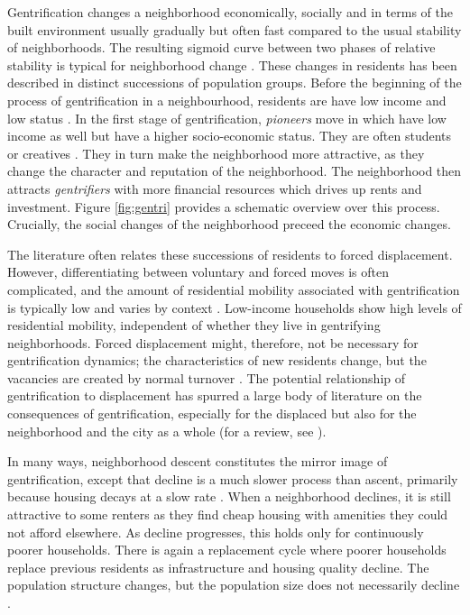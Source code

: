 \documentclass[a4paper,12pt]{article}
\begin{document}
Gentrification changes a neighborhood economically, socially and in terms of the built environment usually gradually but often fast compared to the usual stability of neighborhoods. The resulting sigmoid curve between two phases of relative stability is typical for neighborhood change \citep[927f]{meenSocialBehaviourBasis2003}. These changes in residents has been described in distinct successions of population groups. Before the beginning of the process of gentrification in a neighbourhood, residents are have low income and low status \citep{zukinGentrificationCultureCapital1987, dangschatGentrificationHamburg1991, blasiusPioneersGentrifiersProcess2016}. In the first stage of gentrification, \textit{pioneers} move in which have low income as well but have a higher socio-economic status. They are often students or creatives \citep{zukinGentrificationCultureCapital1987, blasiusPioneersGentrifiersProcess2016}. They in turn make the neighborhood more attractive, as they change the character and reputation of the neighborhood. The neighborhood then attracts \textit{gentrifiers} with more financial resources which drives up rents and investment. Figure \ref{fig:gentri} provides a schematic overview over this process. Crucially, the social changes of the neighborhood preceed the economic changes.

The literature often relates these successions of residents to forced displacement. However, differentiating between voluntary and forced moves is often complicated, and the amount of residential mobility associated with gentrification is typically low and varies by context \citep{freemanDisplacementSuccessionResidential2005, dingGentrificationResidentialMobility2016, leeGeographyGentrificationResidential2023}. Low-income households show high levels of residential mobility, independent of whether they live in gentrifying neighborhoods. Forced displacement might, therefore, not be necessary for gentrification dynamics; the characteristics of new residents change, but the vacancies are created by normal turnover \citep{freemanDisplacementSuccessionResidential2005}. The potential relationship of gentrification to displacement has spurred a large body of literature on the consequences of gentrification, especially for the displaced but also for the neighborhood and the city as a whole (for a review, see \cite{atkinsonEvidenceImpactGentrification2004}). 

In many ways, neighborhood descent constitutes the mirror image of gentrification, except that decline is a much slower process than ascent, primarily because housing decays at a slow rate \citep{glaeserUrbanDeclineDurable2005}. When a neighborhood declines, it is still attractive to some renters as they find cheap housing with amenities they could not afford elsewhere. As decline progresses, this holds only for continuously poorer households. There is again a replacement cycle where poorer households replace previous residents as infrastructure and housing quality decline. The population structure changes, but the population size does not necessarily decline \citep{guerrieriWithinCityVariationUrban2012}.
\end{document}
